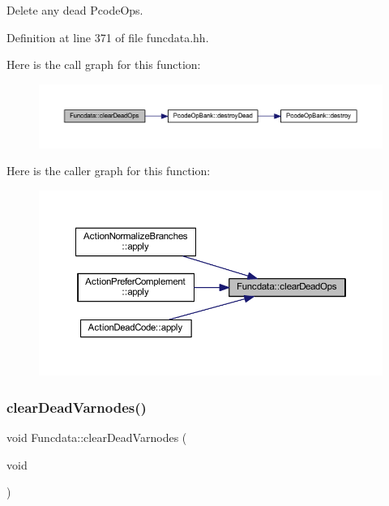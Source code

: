 Delete any dead Pcode\+Ops. 



Definition at line 371 of file funcdata.\+hh.

Here is the call graph for this function\+:
\nopagebreak
\begin{figure}[H]
\begin{center}
\leavevmode
\includegraphics[width=350pt]{class_funcdata_adbb872f99bf69e4101034da41cdebd84_cgraph}
\end{center}
\end{figure}
Here is the caller graph for this function\+:
\nopagebreak
\begin{figure}[H]
\begin{center}
\leavevmode
\includegraphics[width=350pt]{class_funcdata_adbb872f99bf69e4101034da41cdebd84_icgraph}
\end{center}
\end{figure}
\mbox{\label{class_funcdata_a4096b0e76e9015f9aa61fa56cb85d79c}} 
\subsubsection{\texorpdfstring{clearDeadVarnodes()}{clearDeadVarnodes()}}
{\footnotesize\ttfamily void Funcdata\+::clear\+Dead\+Varnodes (\begin{DoxyParamCaption}\item[{void}]{ }\end{DoxyParamCaption})}



